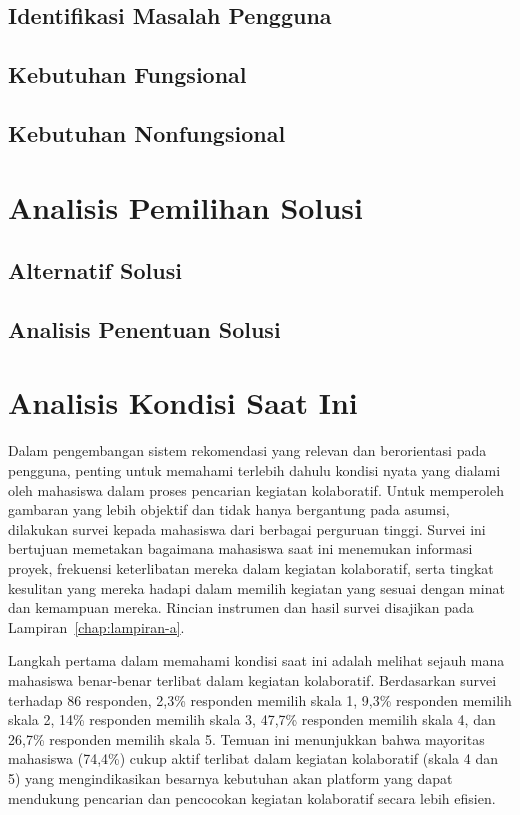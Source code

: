 \subsection{Identifikasi Masalah Pengguna}
\lipsum[5]
\subsection{Kebutuhan Fungsional}
\lipsum[6]
\subsection{Kebutuhan Nonfungsional}
\lipsum[7]

\section{Analisis Pemilihan Solusi}
\subsection{Alternatif Solusi}
\lipsum[8]
\subsection{Analisis Penentuan Solusi}
\lipsum[9]
\fi


\section{Analisis Kondisi Saat Ini}

Dalam pengembangan sistem rekomendasi yang relevan dan berorientasi pada pengguna, penting untuk memahami terlebih dahulu kondisi nyata yang dialami oleh mahasiswa dalam proses pencarian kegiatan kolaboratif. Untuk memperoleh gambaran yang lebih objektif dan tidak hanya bergantung pada asumsi, dilakukan survei kepada mahasiswa dari berbagai perguruan tinggi. Survei ini bertujuan memetakan bagaimana mahasiswa saat ini menemukan informasi proyek, frekuensi keterlibatan mereka dalam kegiatan kolaboratif, serta tingkat kesulitan yang mereka hadapi dalam memilih kegiatan yang sesuai dengan minat dan kemampuan mereka. Rincian instrumen dan hasil survei disajikan pada Lampiran~\ref{chap:lampiran-a}.

Langkah pertama dalam memahami kondisi saat ini adalah melihat sejauh mana mahasiswa benar-benar terlibat dalam kegiatan kolaboratif. Berdasarkan survei terhadap 86 responden, 2,3\% responden memilih skala 1, 9,3\% responden memilih skala 2, 14\% responden memilih skala 3, 47,7\% responden memilih skala 4, dan 26,7\% responden memilih skala 5. Temuan ini menunjukkan bahwa mayoritas mahasiswa (74,4\%) cukup aktif terlibat dalam kegiatan kolaboratif (skala 4 dan 5) yang mengindikasikan besarnya kebutuhan akan platform yang dapat mendukung pencarian dan pencocokan kegiatan kolaboratif secara lebih efisien.

